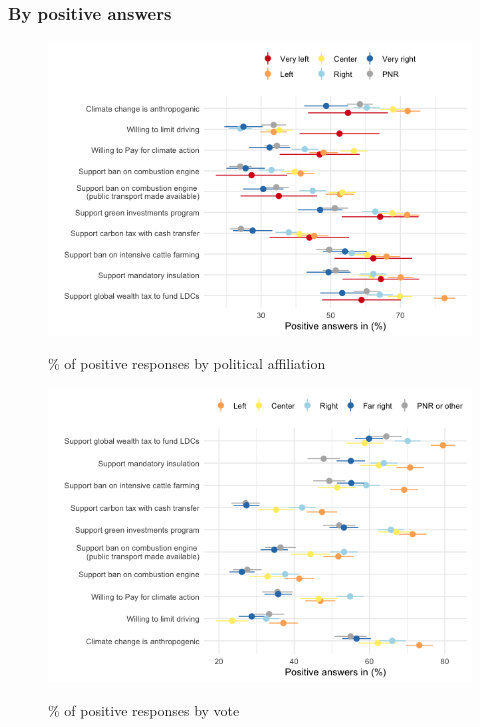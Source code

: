 \begin{framefont}{\small}
\subsubsection{By positive answers}

\begin{frame}{}%
\begin{figure}[h!]
\caption{\% of positive responses by political affiliation}
\includegraphics[width=.7\paperwidth]{../figures/FR/positive_all_by_political_FR.png} \\
\end{figure}
\end{frame}

\begin{frame}{}%
\begin{figure}[h!]
\caption{\% of positive responses by vote}
\includegraphics[width=.7\paperwidth]{../figures/FR/positive_all_by_vote_agg_FR.png} \\
\end{figure}
\end{frame}


\end{framefont}
